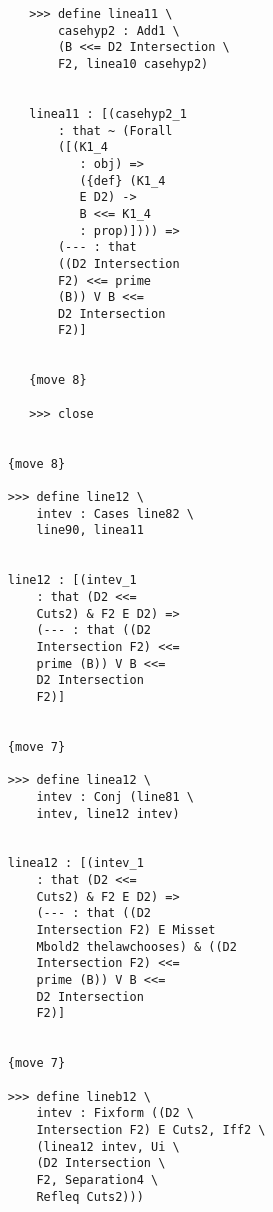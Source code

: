 \documentclass[12pt]{article}
\begin{document}
\begin{verbatim}
                           >>> define linea11 \
                               casehyp2 : Add1 \
                               (B <<= D2 Intersection \
                               F2, linea10 casehyp2)


                           linea11 : [(casehyp2_1 
                               : that ~ (Forall 
                               ([(K1_4 
                                  : obj) => 
                                  ({def} (K1_4 
                                  E D2) -> 
                                  B <<= K1_4 
                                  : prop)]))) => 
                               (--- : that 
                               ((D2 Intersection 
                               F2) <<= prime 
                               (B)) V B <<= 
                               D2 Intersection 
                               F2)]


                           {move 8}

                           >>> close


                        {move 8}

                        >>> define line12 \
                            intev : Cases line82 \
                            line90, linea11


                        line12 : [(intev_1 
                            : that (D2 <<= 
                            Cuts2) & F2 E D2) => 
                            (--- : that ((D2 
                            Intersection F2) <<= 
                            prime (B)) V B <<= 
                            D2 Intersection 
                            F2)]


                        {move 7}

                        >>> define linea12 \
                            intev : Conj (line81 \
                            intev, line12 intev)


                        linea12 : [(intev_1 
                            : that (D2 <<= 
                            Cuts2) & F2 E D2) => 
                            (--- : that ((D2 
                            Intersection F2) E Misset 
                            Mbold2 thelawchooses) & ((D2 
                            Intersection F2) <<= 
                            prime (B)) V B <<= 
                            D2 Intersection 
                            F2)]


                        {move 7}

                        >>> define lineb12 \
                            intev : Fixform ((D2 \
                            Intersection F2) E Cuts2, Iff2 \
                            (linea12 intev, Ui \
                            (D2 Intersection \
                            F2, Separation4 \
                            Refleq Cuts2)))



\end{verbatim}
\end{document}
